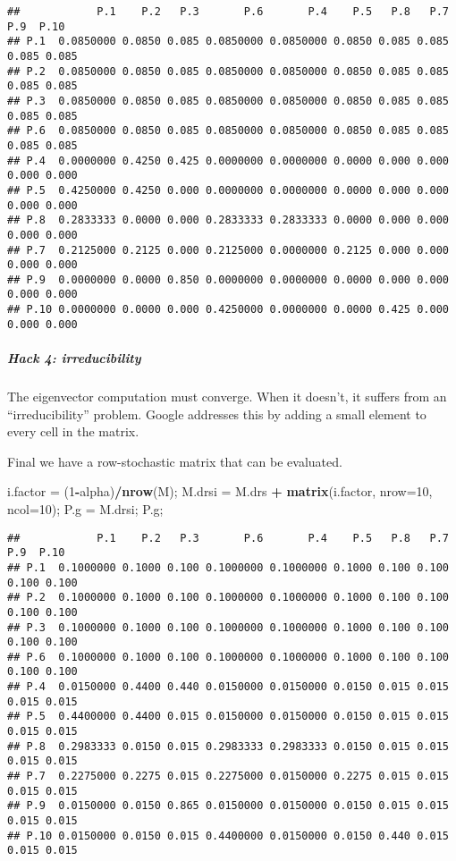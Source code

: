 \documentclass[
]{article}
\newenvironment{Shaded}{\begin{snugshade}}{\end{snugshade}}
\newcommand{\DataTypeTok}[1]{\textcolor[rgb]{0.13,0.29,0.53}{#1}}
\newcommand{\DecValTok}[1]{\textcolor[rgb]{0.00,0.00,0.81}{#1}}
\newcommand{\KeywordTok}[1]{\textcolor[rgb]{0.13,0.29,0.53}{\textbf{#1}}}
\newcommand{\NormalTok}[1]{#1}
\newcommand{\OperatorTok}[1]{\textcolor[rgb]{0.81,0.36,0.00}{\textbf{#1}}}
\newcommand{\StringTok}[1]{\textcolor[rgb]{0.31,0.60,0.02}{#1}}
\begin{document}
\begin{verbatim}
##            P.1    P.2   P.3       P.6       P.4    P.5   P.8   P.7   P.9  P.10
## P.1  0.0850000 0.0850 0.085 0.0850000 0.0850000 0.0850 0.085 0.085 0.085 0.085
## P.2  0.0850000 0.0850 0.085 0.0850000 0.0850000 0.0850 0.085 0.085 0.085 0.085
## P.3  0.0850000 0.0850 0.085 0.0850000 0.0850000 0.0850 0.085 0.085 0.085 0.085
## P.6  0.0850000 0.0850 0.085 0.0850000 0.0850000 0.0850 0.085 0.085 0.085 0.085
## P.4  0.0000000 0.4250 0.425 0.0000000 0.0000000 0.0000 0.000 0.000 0.000 0.000
## P.5  0.4250000 0.4250 0.000 0.0000000 0.0000000 0.0000 0.000 0.000 0.000 0.000
## P.8  0.2833333 0.0000 0.000 0.2833333 0.2833333 0.0000 0.000 0.000 0.000 0.000
## P.7  0.2125000 0.2125 0.000 0.2125000 0.0000000 0.2125 0.000 0.000 0.000 0.000
## P.9  0.0000000 0.0000 0.850 0.0000000 0.0000000 0.0000 0.000 0.000 0.000 0.000
## P.10 0.0000000 0.0000 0.000 0.4250000 0.0000000 0.0000 0.425 0.000 0.000 0.000
\end{verbatim}

\hypertarget{hack-4-irreducibility}{%
\subparagraph{Hack 4: irreducibility}\label{hack-4-irreducibility}}

The eigenvector computation must converge. When it doesn't, it suffers
from an ``irreducibility'' problem. Google addresses this by adding a
small element to every cell in the matrix.

Final we have a row-stochastic matrix that can be evaluated.

\begin{Shaded}
\begin{Highlighting}[]
\NormalTok{i.factor =}\StringTok{ }\NormalTok{(}\DecValTok{1}\OperatorTok{{-}}\NormalTok{alpha)}\OperatorTok{/}\KeywordTok{nrow}\NormalTok{(M);  }
\NormalTok{M.drsi =}\StringTok{ }\NormalTok{M.drs }\OperatorTok{+}\StringTok{ }\KeywordTok{matrix}\NormalTok{(i.factor, }\DataTypeTok{nrow=}\DecValTok{10}\NormalTok{, }\DataTypeTok{ncol=}\DecValTok{10}\NormalTok{);}
\NormalTok{P.g =}\StringTok{ }\NormalTok{M.drsi;}
\NormalTok{P.g;}
\end{Highlighting}
\end{Shaded}

\begin{verbatim}
##            P.1    P.2   P.3       P.6       P.4    P.5   P.8   P.7   P.9  P.10
## P.1  0.1000000 0.1000 0.100 0.1000000 0.1000000 0.1000 0.100 0.100 0.100 0.100
## P.2  0.1000000 0.1000 0.100 0.1000000 0.1000000 0.1000 0.100 0.100 0.100 0.100
## P.3  0.1000000 0.1000 0.100 0.1000000 0.1000000 0.1000 0.100 0.100 0.100 0.100
## P.6  0.1000000 0.1000 0.100 0.1000000 0.1000000 0.1000 0.100 0.100 0.100 0.100
## P.4  0.0150000 0.4400 0.440 0.0150000 0.0150000 0.0150 0.015 0.015 0.015 0.015
## P.5  0.4400000 0.4400 0.015 0.0150000 0.0150000 0.0150 0.015 0.015 0.015 0.015
## P.8  0.2983333 0.0150 0.015 0.2983333 0.2983333 0.0150 0.015 0.015 0.015 0.015
## P.7  0.2275000 0.2275 0.015 0.2275000 0.0150000 0.2275 0.015 0.015 0.015 0.015
## P.9  0.0150000 0.0150 0.865 0.0150000 0.0150000 0.0150 0.015 0.015 0.015 0.015
## P.10 0.0150000 0.0150 0.015 0.4400000 0.0150000 0.0150 0.440 0.015 0.015 0.015
\end{verbatim}
\end{document}
